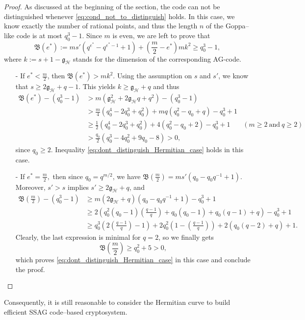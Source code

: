 \documentclass[a4paper]{article}
\theoremstyle{definition}
\theoremstyle{remark}
\newcommand{\calH}{\mathcal{H}}
\begin{document}
\begin{proof}
    As discussed at the beginning of the section, the code can not be distinguished whenever \eqref{eq:cond_not_to_distinguish} holds. In this case, we know exactly the number of rational points, and thus the length $n$ of the Goppa--like code is at most $q_0^3-1$. Since $m$ is even, we are left to prove that 
    \begin{equation} \label{eq:dont_distinguish_Hermitian_case}
    \mathfrak{B}(e^*) := ms'(q^{e^*}-q^{e^*-1}+1) + \left( \frac{m}{2}-e^*\right)mk^2 \geq q_0^3-1,
    \end{equation}
    where $k := s+1-\mathfrak{g}_{\calH}$ stands  for the dimension of the corresponding AG-code.
    \begin{itemize}
        \item [-] If $e^* < \frac{m}{2}$, then $\mathfrak{B}(e^*) > mk^2$. Using the assumption on $s$ and $s'$, we know that $s \geq 2\mathfrak{g}_{\calH}+q-1$. This yields $k \geq \mathfrak{g}_{\calH}+q$ and thus
        \begin{align*}
\mathfrak{B}(e^*) - (q_0^3-1) 
&> m(\mathfrak{g}_{\calH}^2+2\mathfrak{g}_{\calH}q+q^2)-(q_0^3-1)&\\
& > \frac{m}{4}(q_0^4-2q_0^3+q_0^2) + mq(q_0^2-q_0+q) -q_0^3+1 &\\
& \geq \frac{1}{2}(q_0^4-2q_0^3+q_0^2)+4(q_0^2-q_0+2)-q_0^3+1 \quad &(m\geq 2 \ \mathrm{and} \ q\geq 2)&\\
& > \frac{q_0}{2} (q_0^3-4q_0^2+9q_0-8) > 0,&
        \end{align*}
        since $q_0 \geq 2$. Inequality \eqref{eq:dont_distinguish_Hermitian_case} holds in this case.
        \item[-] If $e^* = \frac{m}{2},$ then since $q_0=q^{m/2}$, we have $\mathfrak{B}\left(\frac{m}{2}\right) = ms'(q_0-q_0q^{-1}+1)$. Moreover, $s'>s$ implies $s' \geq 2\mathfrak{g}_{\calH}+q$, and
        \begin{align*}
           \mathfrak{B}\left(\frac{m}{2}\right) - (q_0^3-1) 
           &\geq m(2\mathfrak{g}_{\calH}+q)(q_0-q_0q^{-1}+1)-q_0^3+1 \\ 
           &\geq 2\left(q_0^2(q_0-1)\left(\frac{q-1}{q}\right)+q_0(q_0-1)+q_0(q-1)+q\right)-q_0^3+1 \\
           & \geq q_0^3\left(2\left(\frac{q-1}{q}\right)-1\right) + 2q_0^2\left(1-\left(\frac{q-1}{q}\right)\right) + 2(q_0(q-2)+q)+1.
        \end{align*}
        Clearly, the last expression is minimal for $q=2$, so we finally gets
        $$\mathfrak{B}\left(\frac{m}{2}\right) \geq q_0^2 + 5 >0,$$
        which proves \eqref{eq:dont_distinguish_Hermitian_case} in this case and conclude the proof.
    \end{itemize}
\end{proof}
Consequently, it is still reasonable to consider the Hermitian curve to build efficient SSAG code--based cryptosystem.


\clearpage


\end{document}

